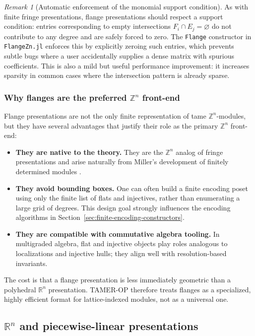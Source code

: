 \documentclass{article}
\newcommand{\<}{\langle}
\renewcommand{\>}{\rangle}
\theoremstyle{definition}
\theoremstyle{remark}
\newtheorem*{remark}{Remark}
\begin{document}
	\begin{remark}[Automatic enforcement of the monomial support condition]
		As with finite fringe presentations, flange presentations should respect a support condition:
		entries corresponding to empty intersections $F_i\cap E_j=\varnothing$ do not contribute to any degree and are
		safely forced to zero.  The \texttt{Flange} constructor in \texttt{FlangeZn.jl} enforces this by explicitly
		zeroing such entries, which prevents subtle bugs where a user accidentally supplies a dense matrix with
		spurious coefficients.  This is also a mild but useful performance improvement: it increases sparsity in
		common cases where the intersection pattern is already sparse.
	\end{remark}
	
	\subsubsection*{Why flanges are the preferred $\mathbb{Z}^n$ front-end}
	
	Flange presentations are not the only finite representation of tame $\mathbb{Z}^n$-modules, but they have several
	advantages that justify their role as the primary $\mathbb{Z}^n$ front-end:
	\begin{itemize}
		\item \textbf{They are native to the theory.}  They are the $\mathbb{Z}^n$ analog of fringe presentations and arise naturally from Miller's development of finitely determined modules \cite{Mil20}.
		\item \textbf{They avoid bounding boxes.}  One can often build a finite encoding poset using only the finite list
		of flats and injectives, rather than enumerating a large grid of degrees.  This design goal strongly influences
		the encoding algorithms in Section~\ref{sec:finite-encoding-constructors}.
		\item \textbf{They are compatible with commutative algebra tooling.}  In multigraded algebra, flat and injective
		objects play roles analogous to localizations and injective hulls; they align well with resolution-based invariants.
	\end{itemize}
	The cost is that a flange presentation is less immediately geometric than a polyhedral $\mathbb{R}^n$ presentation.
	TAMER-OP therefore treats flanges as a specialized, highly efficient format for lattice-indexed modules, not as a
	universal one.
	
	\subsection{$\mathbb{R}^n$ and piecewise-linear presentations}\label{subsec:Rn-PL-presentations}
	
\end{document}
